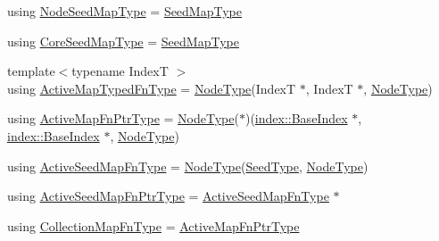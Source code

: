 \begin{DoxyCompactItemize}
\item 
using \hyperlink{namespacevt_1_1mapping_a84d654b657f2dbe639ada06ae688e4c7}{Node\+Seed\+Map\+Type} = \hyperlink{namespacevt_1_1mapping_a1c1409d9af8d1ac402af022a65be4a4d}{Seed\+Map\+Type}
\item 
using \hyperlink{namespacevt_1_1mapping_a963a37316992c8805e9a381a07380de0}{Core\+Seed\+Map\+Type} = \hyperlink{namespacevt_1_1mapping_a1c1409d9af8d1ac402af022a65be4a4d}{Seed\+Map\+Type}
\item 
{\footnotesize template$<$typename IndexT $>$ }\\using \hyperlink{namespacevt_1_1mapping_ad7c0812428b339edd904a865e0080ecd}{Active\+Map\+Typed\+Fn\+Type} = \hyperlink{namespacevt_a866da9d0efc19c0a1ce79e9e492f47e2}{Node\+Type}(IndexT $\ast$, IndexT $\ast$, \hyperlink{namespacevt_a866da9d0efc19c0a1ce79e9e492f47e2}{Node\+Type})
\item 
using \hyperlink{namespacevt_1_1mapping_a748d5efb71ca5878288d5809f57d7254}{Active\+Map\+Fn\+Ptr\+Type} = \hyperlink{namespacevt_a866da9d0efc19c0a1ce79e9e492f47e2}{Node\+Type}($\ast$)(\hyperlink{structvt_1_1index_1_1_base_index}{index\+::\+Base\+Index} $\ast$, \hyperlink{structvt_1_1index_1_1_base_index}{index\+::\+Base\+Index} $\ast$, \hyperlink{namespacevt_a866da9d0efc19c0a1ce79e9e492f47e2}{Node\+Type})
\item 
using \hyperlink{namespacevt_1_1mapping_ab9cfcd87eb3ff00e63478d0197056b7e}{Active\+Seed\+Map\+Fn\+Type} = \hyperlink{namespacevt_a866da9d0efc19c0a1ce79e9e492f47e2}{Node\+Type}(\hyperlink{namespacevt_ae2e13198bdef4d5b8e603d6c1c7f0969}{Seed\+Type}, \hyperlink{namespacevt_a866da9d0efc19c0a1ce79e9e492f47e2}{Node\+Type})
\item 
using \hyperlink{namespacevt_1_1mapping_a254b50d55be91c3bd002481b2e96da7e}{Active\+Seed\+Map\+Fn\+Ptr\+Type} = \hyperlink{namespacevt_1_1mapping_ab9cfcd87eb3ff00e63478d0197056b7e}{Active\+Seed\+Map\+Fn\+Type} $\ast$
\item 
using \hyperlink{namespacevt_1_1mapping_a2910ab582d95478603cdca7480af65b2}{Collection\+Map\+Fn\+Type} = \hyperlink{namespacevt_1_1mapping_a748d5efb71ca5878288d5809f57d7254}{Active\+Map\+Fn\+Ptr\+Type}
\end{DoxyCompactItemize}

